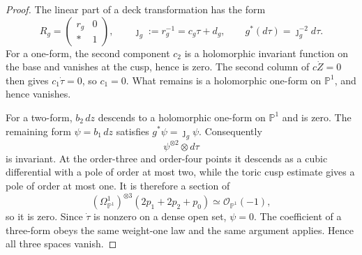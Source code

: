 \begin{proof}
The linear part of a deck transformation has the form
\[
 R_g=\begin{pmatrix}r_g&0\\ *&1\end{pmatrix},
 \qquad \jmath_g:=r_g^{-1}=c_g\tau+d_g,
 \qquad g^*(d\tau)=\jmath_g^{-2}d\tau.
\]
For a one-form, the second component $c_2$ is a holomorphic invariant
function on the base and vanishes at the cusp, hence is zero.  The second
column of $c\dot Z=0$ then gives $c_1\dot\tau=0$, so $c_1=0$.  What remains
is a holomorphic one-form on $\mathbb P^1$, and hence vanishes.

For a two-form, $b_2\,dz$ descends to a holomorphic one-form on
$\mathbb P^1$ and is zero.  The remaining form
$\psi=b_1\,dz$ satisfies $g^*\psi=\jmath_g\psi$.  Consequently
\[
 \psi^{\otimes2}\otimes d\tau
\]
is invariant.  At the order-three and order-four points it descends as a
cubic differential with a pole of order at most two, while the toric cusp
estimate gives a pole of order at most one.  It is therefore a section of
\[
 (\Omega^1_{\mathbb P^1})^{\otimes3}
 (2p_1+2p_2+p_0)\simeq\mathcal O_{\mathbb P^1}(-1),
\]
so it is zero.  Since $\dot\tau$ is nonzero on a dense open set,
$\psi=0$.  The coefficient of a three-form obeys the same weight-one law
and the same argument applies.  Hence all three spaces vanish.
\end{proof}
